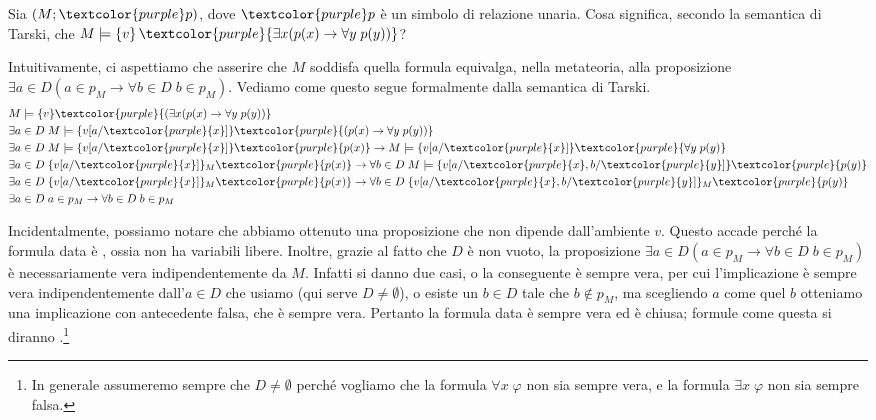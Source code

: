 \begin{example}
    Sia $(M;\textcolor{purple}p)$, dove $\textcolor{purple}p$ è un simbolo di relazione unaria. Cosa significa, secondo la semantica di Tarski, che $M \models \{v\}\,\textcolor{purple}{\exists x(p(x) \to \forall y \; p(y))}$?
\end{example}

\begin{soln}
    Intuitivamente, ci aspettiamo che asserire che $M$ soddisfa quella formula equivalga, nella metateoria, alla proposizione $\exists a \in D(a \in p_M \to \forall b \in D \; b \in p_M)$.
    Vediamo come questo segue formalmente dalla semantica di Tarski.
    \begin{align*}
        & M \models \{v\} \textcolor{purple}{(\exists x(p(x) \to \forall y \; p(y))} \\
        & \exists a \in D \; M \models \{v[a/\textcolor{purple}{x}]\} \textcolor{purple}{(p(x) \to \forall y \; p(y))} \\
        & \exists a \in D \; M \models \{v[a/\textcolor{purple}{x}]\} \textcolor{purple}{p(x)} \to M \models \{v[a/\textcolor{purple}{x}]\} \textcolor{purple}{\forall y \; p(y)} \\
        & \exists a \in D \; \{v[a/\textcolor{purple}{x}]\}_M \textcolor{purple}{p(x)} \to \forall b \in D \; M \models \{v[a/\textcolor{purple}{x},b/\textcolor{purple}{y}]\} \textcolor{purple}{p(y)} \\
        & \exists a \in D \; \{v[a/\textcolor{purple}{x}]\}_M \textcolor{purple}{p(x)} \to \forall b \in D \; \{v[a/\textcolor{purple}{x},b/\textcolor{purple}{y}]\}_M \textcolor{purple}{p(y)} \\
        & \exists a \in D \; a \in p_M \to \forall b \in D \; b \in p_M
    \end{align*}
\end{soln}

Incidentalmente, possiamo notare che abbiamo ottenuto una proposizione che non dipende dall'ambiente $v$. Questo accade perché la formula data è , ossia non ha variabili libere. Inoltre, grazie al fatto che $D$ è non vuoto,
la proposizione $\exists a \in D(a \in p_M \to \forall b \in D \; b \in p_M)$ è necessariamente vera indipendentemente da $M$. Infatti si danno due casi, o la conseguente è sempre vera, per cui l'implicazione è sempre vera indipendentemente dall'$a \in D$ che usiamo (qui serve $D \ne \emptyset$),
o esiste un $b \in D$ tale che $b \notin p_M$, ma scegliendo $a$ come quel $b$ otteniamo una implicazione con antecedente falsa, che è sempre vera. Pertanto la formula data è sempre vera ed è chiusa; formule come questa si diranno .\footnote{In generale assumeremo sempre che $D \ne \emptyset$ perché vogliamo che la formula $\forall x \; \varphi$ non sia sempre vera, e la formula $\exists x \; \varphi$ non sia sempre falsa.}

